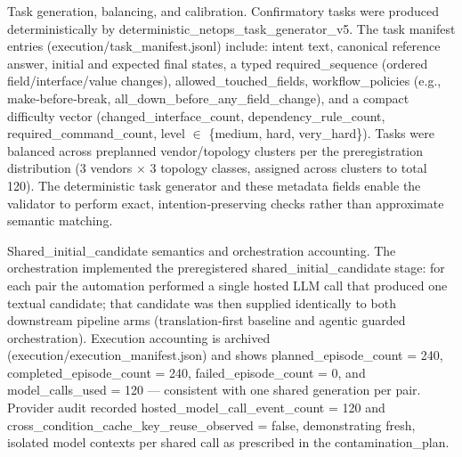 \documentclass[conference]{IEEEtran}
\begin{document}
Task generation, balancing, and calibration. Confirmatory tasks were produced deterministically by deterministic\_netops\_task\_generator\_v5. The task manifest entries (execution/task\_manifest.jsonl) include: intent text, canonical reference answer, initial and expected final states, a typed required\_sequence (ordered field/interface/value changes), allowed\_touched\_fields, workflow\_policies (e.g., make‑before‑break, all\_down\_before\_any\_field\_change), and a compact difficulty vector (changed\_interface\_count, dependency\_rule\_count, required\_command\_count, level \ensuremath{\in} \{medium, hard, very\_hard\}). Tasks were balanced across preplanned vendor/topology clusters per the preregistration distribution (3 vendors \ensuremath{\times} 3 topology classes, assigned across clusters to total 120). The deterministic task generator and these metadata fields enable the validator to perform exact, intention‑preserving checks rather than approximate semantic matching.

Shared\_initial\_candidate semantics and orchestration accounting. The orchestration implemented the preregistered shared\_initial\_candidate stage: for each pair the automation performed a single hosted LLM call that produced one textual candidate; that candidate was then supplied identically to both downstream pipeline arms (translation‑first baseline and agentic guarded orchestration). Execution accounting is archived (execution/execution\_manifest.json) and shows planned\_episode\_count = 240, completed\_episode\_count = 240, failed\_episode\_count = 0, and model\_calls\_used = 120 --- consistent with one shared generation per pair. Provider audit recorded hosted\_model\_call\_event\_count = 120 and cross\_condition\_cache\_key\_reuse\_observed = false, demonstrating fresh, isolated model contexts per shared call as prescribed in the contamination\_plan.
\end{document}
